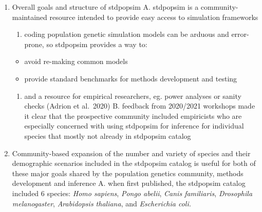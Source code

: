 \documentclass[
  11pt,
]{article}
\providecommand{\tightlist}{%
  \setlength{\itemsep}{0pt}\setlength{\parskip}{0pt}}
\begin{document}
\begin{enumerate}
\def\labelenumi{\arabic{enumi}.}
\tightlist
\item
  Overall goals and structure of stdpopsim A. stdpopsim is a
  community-maintained resource intended to provide easy access to
  simulation frameworks

  \begin{enumerate}
  \def\labelenumii{\roman{enumii}.}
  \tightlist
  \item
    coding population genetic simulation models can be arduous and
    error-prone, so stdpopsim provides a way to:
  \end{enumerate}

  \begin{itemize}
  \tightlist
  \item
    avoid re-making common models
  \item
    provide standard benchmarks for methods development and testing
  \end{itemize}

  \begin{enumerate}
  \def\labelenumii{\roman{enumii}.}
  \setcounter{enumii}{1}
  \tightlist
  \item
    and a resource for empirical researchers, eg. power analyses or
    sanity checks (Adrion et al.~2020) B. feedback from 2020/2021
    workshops made it clear that the prospective community included
    empiricists who are especially concerned with using stdpopsim for
    inference for individual species that mostly not already in
    stdpopsim catalog
  \end{enumerate}
\item
  Community-based expansion of the number and variety of species and
  their demographic scenarios included in the stdpopsim catalog is
  useful for both of these major goals shared by the population genetics
  community, methods development and inference A. when first published,
  the stdpopsim catalog included 6 species: \emph{Homo sapiens},
  \emph{Pongo abelii}, \emph{Canis familiaris}, \emph{Drosophila
  melanogaster}, \emph{Arabidopsis thaliana}, and \emph{Escherichia
  coli.}


\end{enumerate}
\end{document}
